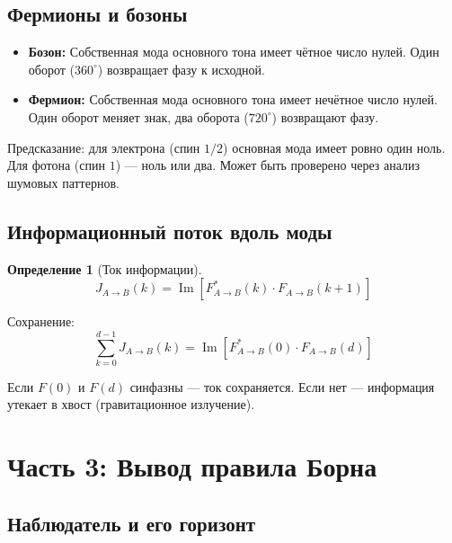 \documentclass[11pt,a4paper]{article}
\newtheorem{definition}{Определение}[section]
\theoremstyle{definition}
\begin{document}
\subsection{Фермионы и бозоны}

\begin{itemize}
    \item \textbf{Бозон:} Собственная мода основного тона имеет чётное число нулей. Один оборот ($360^\circ$) возвращает фазу к исходной.
    \item \textbf{Фермион:} Собственная мода основного тона имеет нечётное число нулей. Один оборот меняет знак, два оборота ($720^\circ$) возвращают фазу.
\end{itemize}

Предсказание: для электрона (спин $1/2$) основная мода имеет ровно один ноль. Для фотона (спин $1$) --- ноль или два. Может быть проверено через анализ шумовых паттернов.

\subsection{Информационный поток вдоль моды}

\begin{definition}[Ток информации]
\begin{equation}
    J_{A \to B}(k) = \operatorname{Im}\left[ F_{A \to B}^*(k) \cdot F_{A \to B}(k+1) \right]
\end{equation}
\end{definition}

Сохранение:
\begin{equation}
    \sum_{k=0}^{d-1} J_{A \to B}(k) = \operatorname{Im}\left[ F_{A \to B}^*(0) \cdot F_{A \to B}(d) \right]
\end{equation}

Если $F(0)$ и $F(d)$ синфазны --- ток сохраняется. Если нет --- информация утекает в хвост (гравитационное излучение).

\newpage
\section{Часть 3: Вывод правила Борна}

\subsection{Наблюдатель и его горизонт}
\end{document}
